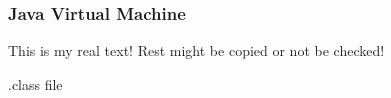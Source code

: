 \subsubsection{Java Virtual Machine} \label{subsubsection:android-evolution-jvm}
This is my real text! Rest might be copied or not be checked!

%

\cite{kovachevaMaster}
%


.class file
